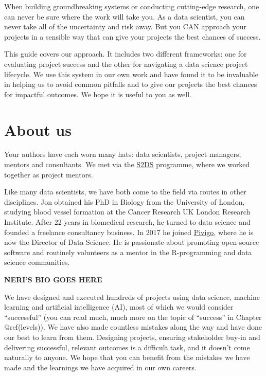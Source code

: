 \documentclass[]{book}
\begin{document}
When building groundbreaking systems or conducting cutting-edge
research, one can never be sure where the work will take you. As a data
scientist, you can never take all of the uncertainty and risk away. But
you CAN approach your projects in a sensible way that can give your
projects the best chances of success.

This guide covers our approach. It includes two different frameworks:
one for evaluating project success and the other for navigating a data
science project lifecycle. We use this system in our own work and have
found it to be invaluable in helping us to avoid common pitfalls and to
give our projects the best chances for impactful outcomes. We hope it is
useful to you as well.

\hypertarget{about-us}{%
\section*{About us}\label{about-us}}

Your authors have each worn many hats: data scientists, project
managers, mentors and consultants. We met via the
\href{http://www.s2ds.org/}{S2DS} programme, where we worked together as
project mentors.

Like many data scientists, we have both come to the field via routes in
other disciplines. Jon obtained his PhD in Biology from the University
of London, studying blood vessel formation at the Cancer Research UK
London Research Institute. After 22 years in biomedical research, he
turned to data science and founded a freelance consultancy business. In
2017 he joined \href{https://www.pivigo.com}{Pivigo}, where he is now
the Director of Data Science. He is passionate about promoting
open-source software and routinely volunteers as a mentor in the
R-programming and data science communities.

\textbf{NERI'S BIO GOES HERE}

We have designed and executed hundreds of projects using data science,
machine learning and artificial intelligence (AI), most of which we
would consider ``successful'' (you can read much, much more on the topic
of ``success'' in Chapter @ref(levels)). We have also made countless
mistakes along the way and have done our best to learn from them.
Designing projects, ensuring stakeholder buy-in and delivering
successful, relevant outcomes is a difficult task, and it doesn't come
naturally to anyone. We hope that you can benefit from the mistakes we
have made and the learnings we have acquired in our own careers.
\end{document}

